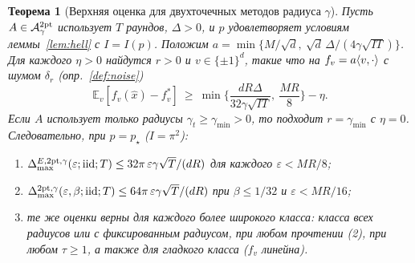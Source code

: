 \documentclass[11pt,a4paper]{article}
\numberwithin{equation}{section}
\newtheorem{theorem}{Теорема}[section]
\theoremstyle{definition}
\theoremstyle{remark}
\newcommand{\E}{\mathbb E}\newcommand{\R}{\mathbb R}\newcommand{\Z}{\mathbb Z}\let\Prob\relax\newcommand{\Prob}{\mathbb P}
\newcommand{\Dmax}{\Delta_{\max}}\newcommand{\Dcp}{\Delta_{\rm cp}}\newcommand{\Dlow}{\Delta_{\rm low}}
\begin{document}
\begin{theorem}[Верхняя оценка для двухточечных методов радиуса $\gamma$]\label{thm:upper}
Пусть $A\in\mathcal A^{\rm 2pt}_\gamma$ использует $T$ раундов, $\Delta>0$, и $p$ удовлетворяет условиям леммы~\ref{lem:hell} с $I=I(p)$. Положим $a=\min\{M/\sqrt d,\ \sqrt d\,\Delta/(4\gamma\sqrt{IT})\}$. Для каждого $\eta>0$ найдутся $r>0$ и $v\in\{\pm1\}^d$, такие что на $f_v=a\langle v,\cdot\rangle$ с шумом $\delta_r$ (опр.~\ref{def:noise})
\[
\E_v[f_v(\hat x)-f_v^*]\ \ge\ \min\Big\{\frac{dR\Delta}{32\gamma\sqrt{IT}},\ \frac{MR}8\Big\}-\eta .
\]
Если $A$ использует только радиусы $\gamma_t\ge\gamma_{\min}>0$, то подходит $r=\gamma_{\min}$ с $\eta=0$. Следовательно, при $p=p_\star$ ($I=\pi^2$):
\begin{enumerate}[label=(\alph*)]
\item $\Dmax^{E,\mathrm{2pt},\gamma}(\varepsilon;\iid;T)\le32\pi\,\varepsilon\gamma\sqrt T/(dR)$ для каждого $\varepsilon<MR/8$;
\item $\Dmax^{\mathrm{2pt},\gamma}(\varepsilon,\beta;\iid;T)\le64\pi\,\varepsilon\gamma\sqrt T/(dR)$ при $\beta\le1/32$ и $\varepsilon<MR/16$;
\item те же оценки верны для каждого более широкого класса: класса всех радиусов или с фиксированным радиусом, при любом прочтении (2), при любом $\tau\ge1$, а также для гладкого класса ($f_v$ линейна).
\end{enumerate}
\end{theorem}
\end{document}
